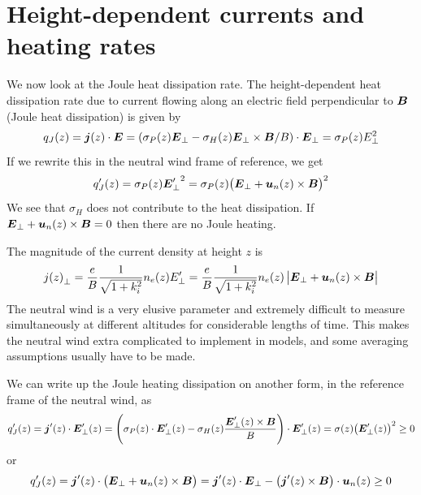 \section{Height-dependent currents and heating rates}
We now look at the Joule heat dissipation rate. The height-dependent heat dissipation rate due to current flowing along an electric field perpendicular to \(\boldsymbol{B}\) (Joule heat dissipation) is given by
\begin{equation*}
    q_J(z)=\boldsymbol{j}(z)\cdot\boldsymbol{E}=(\sigma_P(z)\boldsymbol{E}_\perp-\sigma_H(z)\boldsymbol{E}_\perp\times\boldsymbol{B}/B)\cdot\boldsymbol{E}_\perp=\sigma_P(z)E_\perp^2
\end{equation*}
If we rewrite this in the neutral wind frame of reference, we get
\begin{equation*}
    q_J'(z)=\sigma_P(z){\boldsymbol{E}_\perp'}^2=\sigma_P(z){\left(\boldsymbol{E}_\perp+\boldsymbol{u}_n(z)\times\boldsymbol{B}\right)}^2
\end{equation*}
We see that \(\sigma_H\) does not contribute to the heat dissipation. If \(\boldsymbol{E}_\perp+\boldsymbol{u}_n(z)\times\boldsymbol{B}=0\) then there are no Joule heating.

The magnitude of the current density at height \(z\) is
\begin{equation*}
    j{(z)}_\perp=\frac{e}{B}\frac{1}{\sqrt{1+k_i^2}}n_e(z)E_\perp'=\frac{e}{B}\frac{1}{\sqrt{1+k_i^2}}n_e(z)\left|\boldsymbol{E}_\perp+\boldsymbol{u}_n(z)\times\boldsymbol{B}\right|
\end{equation*}
The neutral wind is a very elusive parameter and extremely difficult to measure simultaneously at different altitudes for considerable lengths of time. This makes the neutral wind extra complicated to implement in models, and some averaging assumptions usually have to be made.

We can write up the Joule heating dissipation on another form, in the reference frame of the neutral wind, as
\begin{equation*}
    q_J'(z)=\boldsymbol{j}'(z)\cdot\boldsymbol{E}_\perp'(z)=\left(\sigma_P(z)\cdot\boldsymbol{E}_\perp'(z)-\sigma_H(z)\frac{\boldsymbol{E}_\perp'(z)\times\boldsymbol{B}}{B}\right)\cdot\boldsymbol{E}_\perp'(z)=\sigma(z){\left(\boldsymbol{E}_\perp'(z)\right)}^2\geq 0
\end{equation*}
or
\begin{equation*}
    q_J'(z)=\boldsymbol{j}'(z)\cdot\left(\boldsymbol{E}_\perp+\boldsymbol{u}_n(z)\times\boldsymbol{B}\right)=\boldsymbol{j}'(z)\cdot\boldsymbol{E}_\perp-\left(\boldsymbol{j}'(z)\times\boldsymbol{B}\right)\cdot\boldsymbol{u}_n(z)\geq 0
\end{equation*}

